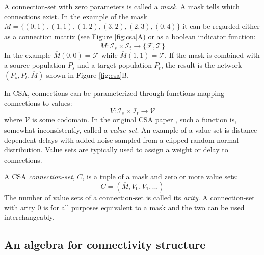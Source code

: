 \documentclass{frontiersSCNS} %
\begin{document}
A connection-set with zero parameters is called a \emph{mask}. A mask
tells which connections exist.  In the example of the mask
$\overline{M} = \{(0,1), (1,1), (1,2), (3,2), (2,3), (0,4)\}$ it can
be regarded either as a connection matrix (see Figure \ref{fig:csa}A)
or as a boolean indicator function:
\begin{equation}
\overline{M} : \mathcal{I}_s \times \mathcal{I}_t \rightarrow \{ \mathcal{F},
\mathcal{T} \}
\end{equation}
In the example $\overline{M}(0,0) = \mathcal{F}$ while
$\overline{M}(1,1) = \mathcal{T}$. If the mask is combined with a
source population $P_s$ and a target population $P_t$, the result is
the network $(P_s, P_t, \overline{M})$ shown in Figure \ref{fig:csa}B.

In CSA, connections can be parameterized through functions mapping
connections to values:
\begin{equation}
V : \mathcal{I}_s \times \mathcal{I}_t \rightarrow \mathcal{V}
\end{equation}
where $\mathcal{V}$ is some codomain. In the original CSA paper
\citep{djurfeldt12}, such a function is, somewhat inconsistently,
called a \emph{value set}. An example of a value set is distance
dependent delays with added noise sampled from a clipped random normal
distribution. Value sets are typically used to assign a weight or
delay to connections.

A CSA \emph{connection-set}, $C$, is a tuple of a mask and zero or
more value sets:
\begin{equation}
C = (\overline{M}, V_0, V_1, ...)
\end{equation}
The number of value sets of a connection-set is called its
\emph{arity}. A connection-set with arity 0 is for all purposes
equivalent to a mask and the two can be used interchangeably.

\subsection{An algebra for connectivity structure}\label{sec:structure}
\end{document}
